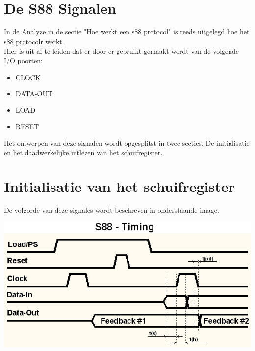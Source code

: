 \section{De S88 Signalen}

In de Analyze in de sectie "Hoe werkt een s88 protocol" is reeds uitgelegd hoe het s88 protocolr werkt. 
\\
Hier is uit af te leiden dat er door er gebruikt gemaakt wordt van de volgende I/O poorten:

\begin{itemize}
	\item CLOCK
	\item DATA-OUT
	\item LOAD
	\item RESET
\end{itemize}

Het ontwerpen van deze signalen wordt opgesplitst in twee secties, De initialisatie en het daadwerkelijke uitlezen van het schuifregister.

\section{Initialisatie van het schuifregister}


De volgorde van deze signales wordt beschreven in onderstaande image.

\includegraphics[scale=0.9]{./img/s88timing.png}

